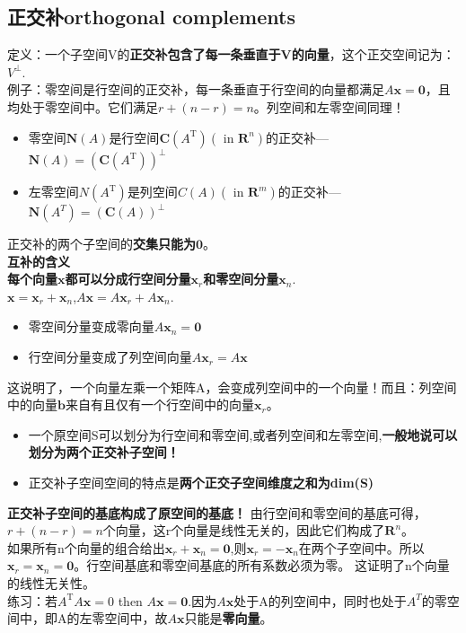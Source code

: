 \documentclass[UTF8]{article}
\begin{document}
    \subsection{正交补orthogonal complements}
    定义：一个子空间V的\textbf{正交补包含了每一条垂直于V的向量}，这个正交空间记为：$V^\perp$.\\
    例子：零空间是行空间的正交补，每一条垂直于行空间的向量都满足$A\bm{x}=\bm{0}$，且均处于零空间中。它们满足$r+(n-r)=n$。列空间和左零空间同理！
    \\
    \begin{itemize}
        \item 零空间$\mathbf{N}(A)$是行空间$\boldsymbol{C}\left(A^{\mathrm{T}}\right)\left(\text { in } \mathbf{R}^{n}\right)$的正交补---$\mathbf{N}(A) = (\boldsymbol{C}\left(A^{\mathrm{T}}\right))^\perp$
        \item 左零空间$N\left(A^{\mathrm{T}}\right)$是列空间$C(A)\left(\text { in } \mathbf{R}^{m}\right)$的正交补---$\mathbf{N}(A^T) = (\boldsymbol{C}\left(A\right))^\perp$
    \end{itemize}
    正交补的两个子空间的\textbf{交集只能为}$\bm{0}$。 \\
    \textbf{互补的含义}\\
    \textbf{每个向量$\bm{x}$都可以分成行空间分量$\bm{x}_r$和零空间分量$\bm{x}_n$}.\\
    $\boldsymbol{x}=\boldsymbol{x}_{r}+\boldsymbol{x}_{n}$,\quad $A \boldsymbol{x}=A \boldsymbol{x}_{r}+A \boldsymbol{x}_{n}$.
    \begin{itemize}
        \item 零空间分量变成零向量$A \boldsymbol{x}_{n}=\mathbf{0}$
        \item 行空间分量变成了列空间向量$A \boldsymbol{x}_{r}=A \boldsymbol{x}$
    \end{itemize}
    这说明了，一个向量左乘一个矩阵A，会变成列空间中的一个向量！而且：列空间中的向量$\bm{b}$来自有且仅有一个行空间中的向量$\bm{x}_r$。
    \\
    \begin{itemize}
        \item 一个原空间S可以划分为行空间和零空间,或者列空间和左零空间,\textbf{一般地说可以划分为两个正交补子空间！}
        \item 正交补子空间空间的特点是\textbf{两个正交子空间维度之和为dim(S)}
    \end{itemize}
    \textbf{正交补子空间的基底构成了原空间的基底！}
    由行空间和零空间的基底可得，$r+(n-r)=n$个向量，这r个向量是线性无关的，因此它们构成了$\mathbf{R}^{n}$。
    \\
    如果所有n个向量的组合给出$\boldsymbol{x}_{r}+\boldsymbol{x}_{n}=\mathbf{0}$,则$\boldsymbol{x}_{r}=-\boldsymbol{x}_{n}$在两个子空间中。所以$\boldsymbol{x}_{r}=\boldsymbol{x}_{n}=\bm{0}$。行空间基底和零空间基底的所有系数必须为零。 这证明了n个向量的线性无关性。
    \\
    练习：若$A^{\mathrm{T}} A \boldsymbol{x}=0$ then $A \boldsymbol{x}=\mathbf{0}$.\quad 因为$A \boldsymbol{x}$处于A的列空间中，同时也处于$A^T$的零空间中，即A的左零空间中，故$A \boldsymbol{x}$只能是\textbf{零向量}。
\end{document}
